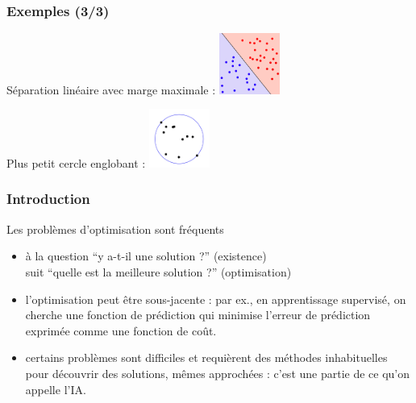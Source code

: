 \documentclass{beamer}
\begin{document}
\begin{frame}
  \frametitle{Exemples (3/3)}
  
  \begin{block}{Séparation linéaire avec marge maximale : }
    \centering
    \includegraphics[width=2cm]{linear-separation.png}
  \end{block}
  
  \begin{block}{Plus petit cercle englobant : }
    \centering
    \includegraphics[width=2cm]{seb.png}
  \end{block}
  
\end{frame}
\begin{frame}
  \frametitle{Introduction}

  \begin{block}{Les problèmes d'optimisation sont fréquents}
  \begin{itemize}
  \item à la question ``y a-t-il une solution ?'' (existence)\\
    suit ``quelle est la meilleure solution ?'' (optimisation)
  \item l'optimisation peut être sous-jacente : par ex., en apprentissage supervisé, on cherche
    une fonction de prédiction qui minimise l'erreur de prédiction exprimée comme une fonction de coût.
  \item certains problèmes sont difficiles et requièrent des méthodes inhabituelles pour découvrir
    des solutions, mêmes approchées : c'est une partie de ce qu'on appelle l'IA.
  \end{itemize}
  \end{block}
  
\end{frame}
\end{document}
